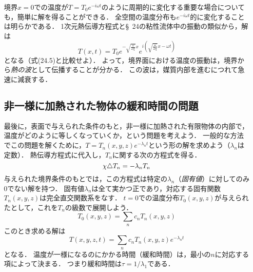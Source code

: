 境界$x=0$での温度が$T=T_0 e^{-i \omega t}$のように周期的に変化する重要な場合についても，簡単に解を得ることができる．
全空間の温度分布も$e^{-i \omega t}$的に変化することは明らかである．
1次元熱伝導方程式と\S~24の粘性流体中の振動の類似から，解は
\begin{equation}\label{eq52.15:熱の波の伝播}
    T(x,t) = T_0 e^{-\sqrt{\frac{\omega}{2\chi}}x} e^{ i \left(\sqrt{\frac{\omega}{2\chi}}x - \omega t \right)}
\end{equation}
となる（式(24.5)と比較せよ）．
よって，境界面における温度の振動は，境界から\emph{熱の波}として伝播することが分かる．
この波は，媒質内部を進むにつれて急速に減衰する．






\subsection*{非一様に加熱された物体の緩和時間の問題}
最後に，表面で与えられた条件のもと，非一様に加熱された有限物体の内部で，温度がどのように等しくなっていくか，という問題を考えよう．
一般的な方法でこの問題を解くために，$T=T_n(x,y,z) e^{-\lambda_n t}$という形の解を求めよう（$\lambda_n$は定数）．
熱伝導方程式に代入し，$T_n$に関する次の方程式を得る．
\begin{equation}\label{eq52.16:熱伝導の固有値方程式}
    \chi \triangle T_n = -\lambda_n T_n
\end{equation}
与えられた境界条件のもとでは，この方程式は特定の$\lambda_n$（\emph{固有値}）に対してのみ0でない解を持つ．
固有値$\lambda_n$は全て実かつ正であり，対応する固有関数$T_n(x,y,z)$は完全直交関数系をなす．
$t=0$での温度分布$T_0(x,y,z)$が与えられたとして，これを$T_n$の級数で展開しよう．
\[
    T_0(x,y,z) = \sum_n c_n T_n(x,y,z)
\]
このとき求める解は
\begin{equation}
    T(x,y,z,t) = \sum_n c_n T_n(x,y,z) e^{-\lambda_n t}
\end{equation}
となる．
温度が一様になるのにかかる時間（緩和時間）は，最小の$n$に対応する項によって決まる．
つまり緩和時間は$\tau=1/\lambda_1$である．













